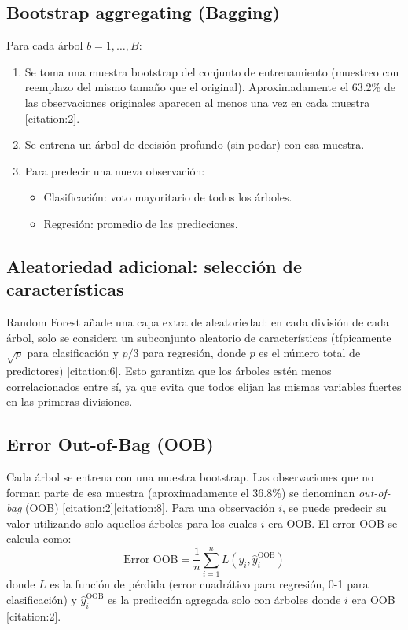 \documentclass[12pt,a4paper,openany,oneside]{book}
\begin{document}
\subsection{Bootstrap aggregating (Bagging)}
Para cada árbol \(b = 1, \dots, B\):
\begin{enumerate}
    \item Se toma una muestra bootstrap del conjunto de entrenamiento (muestreo con reemplazo del mismo tamaño que el original). Aproximadamente el 63.2\% de las observaciones originales aparecen al menos una vez en cada muestra [citation:2].
    \item Se entrena un árbol de decisión profundo (sin podar) con esa muestra.
    \item Para predecir una nueva observación:
        \begin{itemize}
            \item Clasificación: voto mayoritario de todos los árboles.
            \item Regresión: promedio de las predicciones.
        \end{itemize}
\end{enumerate}

\subsection{Aleatoriedad adicional: selección de características}
Random Forest añade una capa extra de aleatoriedad: en cada división de cada árbol, solo se considera un subconjunto aleatorio de características (típicamente \(\sqrt{p}\) para clasificación y \(p/3\) para regresión, donde \(p\) es el número total de predictores) [citation:6]. Esto garantiza que los árboles estén menos correlacionados entre sí, ya que evita que todos elijan las mismas variables fuertes en las primeras divisiones.

\subsection{Error Out-of-Bag (OOB)}
Cada árbol se entrena con una muestra bootstrap. Las observaciones que no forman parte de esa muestra (aproximadamente el 36.8\%) se denominan \textit{out-of-bag} (OOB) [citation:2][citation:8]. Para una observación \(i\), se puede predecir su valor utilizando solo aquellos árboles para los cuales \(i\) era OOB. El error OOB se calcula como:
\[
\text{Error OOB} = \frac{1}{n} \sum_{i=1}^n L(y_i, \hat{y}_i^{\text{OOB}})
\]
donde \(L\) es la función de pérdida (error cuadrático para regresión, 0-1 para clasificación) y \(\hat{y}_i^{\text{OOB}}\) es la predicción agregada solo con árboles donde \(i\) era OOB [citation:2].
\end{document}
